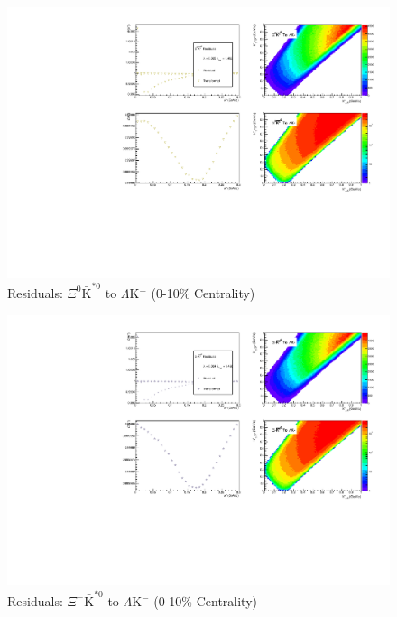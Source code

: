 \documentclass[../AnalysisNoteJBuxton.tex]{subfiles}
\begin{document}
\begin{figure}[h]
  \centering
  \includegraphics[width=\textwidth]{9_AdditionalFigures/Figures/Residuals/LamKchM/Residuals_LamKchM_0010_Xi0AKSt0_MomResCrctn_NonFlatBgdCrctn_ResidualsIncluded_UsingCoulombOnlyInterpCfs.pdf}
  \caption[Residuals: $\Xi^{0}\bar{\mathrm{K}}^{*0}$ to $\Lambda$K$^{-}$ (0-10\% Centrality)]{Residuals: $\Xi^{0}\bar{\mathrm{K}}^{*0}$ to $\Lambda$K$^{-}$ (0-10\% Centrality)}
  \label{fig:Res_LamKchM_0010_Xi0AKSt0}
\end{figure}

\begin{figure}[h]
  \centering
  \includegraphics[width=\textwidth]{9_AdditionalFigures/Figures/Residuals/LamKchM/Residuals_LamKchM_0010_XiAKSt0_MomResCrctn_NonFlatBgdCrctn_ResidualsIncluded_UsingCoulombOnlyInterpCfs.pdf}
  \caption[Residuals: $\Xi^{-}\bar{\mathrm{K}}^{*0}$ to $\Lambda$K$^{-}$ (0-10\% Centrality)]{Residuals: $\Xi^{-}\bar{\mathrm{K}}^{*0}$ to $\Lambda$K$^{-}$ (0-10\% Centrality)}
  \label{fig:Res_LamKchM_0010_XiCAKSt0}
\end{figure}
\end{document}

